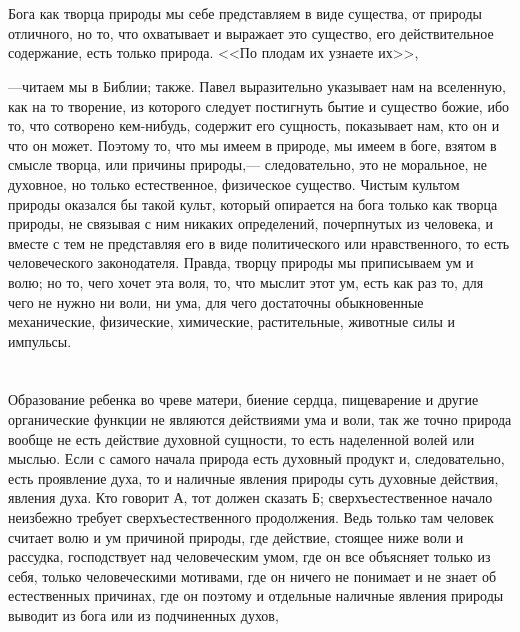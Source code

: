 \documentclass[12pt]{article}
\begin{document}
\section{}

Бога как творца природы мы себе представляем в виде существа, от природы отличного, но то, что охватывает и выражает это существо, его действительное содержание, есть только природа. <<По плодам их узнаете их>>,

---читаем мы в Библии; также. Павел выразительно указывает нам на вселенную, как на то творение, из которого следует постигнуть бытие и существо божие, ибо то, что сотворено кем-нибудь, содержит его сущность, показывает нам, кто он и что он может. Поэтому то, что мы имеем в природе, мы имеем в боге, взятом в смысле творца, или причины природы,--- следовательно, это не моральное, не духовное, но только естественное, физическое существо. Чистым культом природы оказался бы такой культ, который опирается на бога только как творца природы, не связывая с ним никаких определений, почерпнутых из человека, и вместе с тем не представляя его в виде политического или нравственного, то есть человеческого законодателя. Правда, творцу природы мы приписываем ум и волю; но то, чего хочет эта воля, то, что мыслит этот ум, есть как раз то, для чего не нужно ни воли, ни ума, для чего достаточны обыкновенные механические, физические, химические, растительные, животные силы и импульсы.



\section{}

Образование ребенка во чреве матери, биение сердца, пищеварение и другие органические функции не являются действиями ума и воли, так же точно природа вообще не есть действие духовной сущности, то есть наделенной волей или мыслью. Если с самого начала природа есть духовный продукт и, следовательно, есть проявление духа, то и наличные явления природы суть духовные действия, явления духа. Кто говорит А, тот должен сказать Б; сверхъестественное начало неизбежно требует сверхъестественного продолжения. Ведь только там человек считает волю и ум причиной природы, где действие, стоящее ниже воли и рассудка, господствует над человеческим умом, где он все объясняет только из себя, только человеческими мотивами, где он ничего не понимает и не знает об естественных причинах, где он поэтому и отдельные наличные явления природы выводит из бога или из подчиненных духов,
\end{document}
